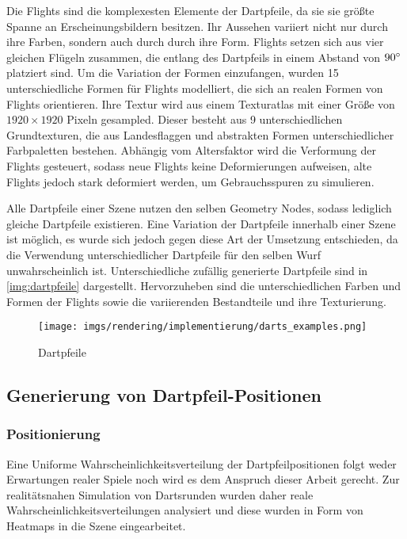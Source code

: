 Die Flights sind die komplexesten Elemente der Dartpfeile, da sie sie größte Spanne an Erscheinungsbildern besitzen. Ihr Aussehen variiert nicht nur durch ihre Farben, sondern auch durch durch ihre Form. Flights setzen sich aus vier gleichen Flügeln zusammen, die entlang des Dartpfeils in einem Abstand von $90^{\circ}$ platziert sind. Um die Variation der Formen einzufangen, wurden 15 unterschiedliche Formen für Flights modelliert, die sich an realen Formen von Flights orientieren. Ihre Textur wird aus einem Texturatlas mit einer Größe von $1920 \times 1920$ Pixeln gesampled. Dieser besteht aus 9 unterschiedlichen Grundtexturen, die aus Landesflaggen und abstrakten Formen unterschiedlicher Farbpaletten bestehen. Abhängig vom Altersfaktor wird die Verformung der Flights gesteuert, sodass neue Flights keine Deformierungen aufweisen, alte Flights jedoch stark deformiert werden, um Gebrauchsspuren zu simulieren.

\vspace{\baselineskip}

Alle Dartpfeile einer Szene nutzen den selben Geometry Nodes, sodass lediglich gleiche Dartpfeile existieren. Eine Variation der Dartpfeile innerhalb einer Szene ist möglich, es wurde sich jedoch gegen diese Art der Umsetzung entschieden, da die Verwendung unterschiedlicher Dartpfeile für den selben Wurf unwahrscheinlich ist. Unterschiedliche zufällig generierte Dartpfeile sind in \autoref{img:dartpfeile} dargestellt. Hervorzuheben sind die unterschiedlichen Farben und Formen der Flights sowie die variierenden Bestandteile und ihre Texturierung.

\begin{figure}
    \centering
    \texttt{[image: imgs/rendering/implementierung/darts\_examples.png]}
    \caption{Dartpfeile}
    \label{img:dartpfeile}
\end{figure}

\subsection{Generierung von Dartpfeil-Positionen}  %
\label{sec:wie_dartpfeil_positionen}

\subsubsection{Positionierung}
\label{sec:dartpfeil_positionierung}

Eine Uniforme Wahrscheinlichkeitsverteilung der Dartpfeilpositionen folgt weder Erwartungen realer Spiele noch wird es dem Anspruch dieser Arbeit gerecht. Zur realitätsnahen Simulation von Dartsrunden wurden daher reale Wahrscheinlichkeitsverteilungen analysiert und diese wurden in Form von Heatmaps in die Szene eingearbeitet.

